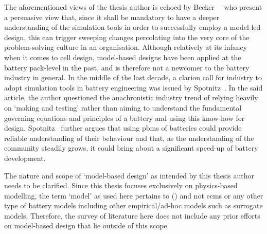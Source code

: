 The   aforementioned    views   of    the   thesis    author   is    echoed   by
Becker~\etal~\cite{Becker2005}  who present  a  persuasive view  that, since  it
shall be  mandatory to have  a deeper understanding  of the simulation  tools in
order  to successfully  employ a  model-led  design, this  can trigger  sweeping
changes percolating  into the  very core  of the  problem-solving culture  in an
organisation. Although relatively  at its infancy when it comes  to cell design,
model-based designs have been applied at the battery pack-level in the past, and
is therefore not a newcomer to the battery industry in general. In the middle of
the  last decade,  a clarion  call  for industry  to adopt  simulation tools  in
battery  engineering was  issued  by Spotnitz~\cite{Spotnitz2005}.  In the  said
article,  the author  questioned  the anachronistic  industry  trend of  relying
heavily on `making and testing' rather than aiming to understand the fundamental
governing equations  and principles  of a  battery and  using this  know-how for
design. Spotnitz~\cite{Spotnitz2005}  further argues  that using  \glspl{pbm} of
batteries could provide  reliable understanding of their behaviour  and that, as
the  understanding of  the  community steadily  grows, it  could  bring about  a
significant speed-up of battery development.

The nature and  scope of `model-based design' as intended  by this thesis author
needs to  be clarified. Since  this thesis focuses exclusively  on physics-based
modelling,  the  term  `model'  as  used  here  pertains  to  
() and  not \glspl{ecm} or  any other type of  battery models
including other empirical/ad-hoc models such as surrogate models. Therefore, the
survey of  literature here  does not  include any  prior efforts  on model-based
design that lie outside of this scope.

